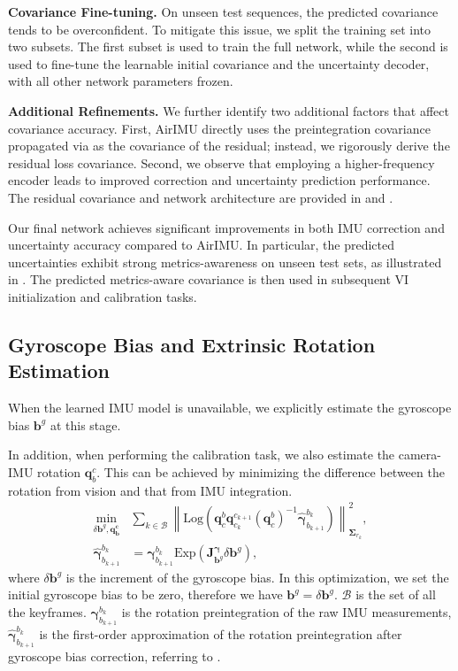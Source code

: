 \noindent \textbf{Covariance Fine-tuning.}
On unseen test sequences, the predicted covariance tends to be overconfident. To mitigate this issue, we split the training set into two subsets. The first subset is used to train the full network, while the second is used to fine-tune the learnable initial covariance and the uncertainty decoder, with all other network parameters frozen.

\noindent \textbf{Additional Refinements.}
We further identify two additional factors that affect covariance accuracy. First, AirIMU directly uses the preintegration covariance propagated via  as the covariance of the residual; instead, we rigorously derive the residual loss covariance. 
Second, we observe that employing a higher-frequency encoder leads to improved correction and uncertainty prediction performance. The residual covariance and network architecture are provided in  and .

Our final network achieves significant improvements in both IMU correction and uncertainty accuracy compared to AirIMU. In particular, the predicted uncertainties exhibit strong metrics-awareness on unseen test sets, as illustrated in . The predicted metrics-aware covariance is then used in subsequent VI initialization and calibration tasks.


\subsection{Gyroscope Bias and Extrinsic Rotation Estimation}
\label{sec:maci2:gyro_bias}

When the learned IMU model is unavailable, we explicitly estimate the gyroscope bias $\mathbf{b}^g$ at this stage. 

In addition, when performing the calibration task, we also estimate the camera-IMU rotation $\mathbf{q}^c_b$. This can be achieved by minimizing the difference between the rotation from vision and that from IMU integration.
\begin{equation}
\begin{aligned}
    \min_{\delta \mathbf{b}^g, \mathbf{q^c_b}} & \sum_{k \in \mathcal{B}} \left\| \text{Log}(\mathbf{q}_c^b \mathbf{q}^{c_{k+1}}_{c_{k}} (\mathbf{q}^b_c)^{-1} \bm{\hat{\gamma}}_{b_{k+1}}^{b_k}) \right\|^2_{\bm{\Sigma}_{r_k}},
    \\
    \bm{\hat{\gamma}}_{b_{k+1}}^{b_k} &= \bm{\gamma}_{b_{k+1}}^{b_k} \text{Exp} \left( \mathbf{J}^{\bm{\gamma}}_{\mathbf{b}^g} \delta \mathbf{b}^g \right),
\end{aligned}
\end{equation}
where $\delta \mathbf{b}^g$ is the increment of the gyroscope bias. 
In this optimization, we set the initial gyroscope bias to be zero, therefore we have $\mathbf{b}^g=\delta \mathbf{b}^g$. $\mathcal{B}$ is the set of all the keyframes. $\boldsymbol{\gamma}_{b_{k+1}}^{b_k}$ is the rotation preintegration of the raw IMU measurements, $\hat{\boldsymbol{\gamma}}_{b_{k+1}}^{b_k}$ is the first-order approximation of the rotation preintegration after gyroscope bias correction, referring to \cite{forster2015imu}. 

